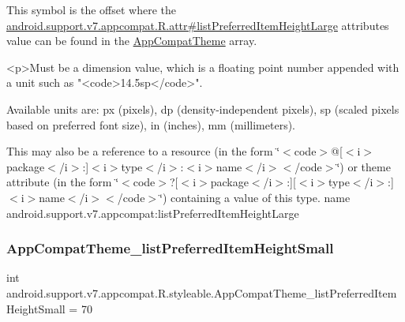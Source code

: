 This symbol is the offset where the \hyperlink{classandroid_1_1support_1_1v7_1_1appcompat_1_1R_1_1attr_acae731c234d2a8927d87b3ecd2fedc93}{android.\+support.\+v7.\+appcompat.\+R.\+attr\#list\+Preferred\+Item\+Height\+Large} attribute\textquotesingle{}s value can be found in the \hyperlink{classandroid_1_1support_1_1v7_1_1appcompat_1_1R_1_1styleable_a5c42f89e8a410c323be34208d75c430b}{App\+Compat\+Theme} array.

\begin{DoxyVerb}      <p>Must be a dimension value, which is a floating point number appended with a unit such as "<code>14.5sp</code>".
\end{DoxyVerb}
 Available units are\+: px (pixels), dp (density-\/independent pixels), sp (scaled pixels based on preferred font size), in (inches), mm (millimeters). 

This may also be a reference to a resource (in the form \char`\"{}$<$code$>$@\mbox{[}$<$i$>$package$<$/i$>$\+:\mbox{]}$<$i$>$type$<$/i$>$\+:$<$i$>$name$<$/i$>$$<$/code$>$\char`\"{}) or theme attribute (in the form \char`\"{}$<$code$>$?\mbox{[}$<$i$>$package$<$/i$>$\+:\mbox{]}\mbox{[}$<$i$>$type$<$/i$>$\+:\mbox{]}$<$i$>$name$<$/i$>$$<$/code$>$\char`\"{}) containing a value of this type.  name android.\+support.\+v7.\+appcompat\+:list\+Preferred\+Item\+Height\+Large \mbox{\label{classandroid_1_1support_1_1v7_1_1appcompat_1_1R_1_1styleable_a9c44e92688d2917cbaa6860767dc5c7f}} 
\subsubsection{\texorpdfstring{App\+Compat\+Theme\+\_\+list\+Preferred\+Item\+Height\+Small}{AppCompatTheme\_listPreferredItemHeightSmall}}
{\footnotesize\ttfamily int android.\+support.\+v7.\+appcompat.\+R.\+styleable.\+App\+Compat\+Theme\+\_\+list\+Preferred\+Item\+Height\+Small = 70\hspace{0.3cm}{\ttfamily [static]}}

